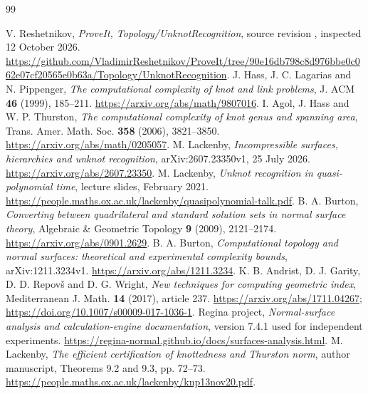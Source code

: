 \documentclass[11pt]{article}
\theoremstyle{definition}
\theoremstyle{remark}
\begin{document}
\begin{thebibliography}{99}
\raggedright
{} V. Reshetnikov, \emph{ProveIt, Topology/UnknotRecognition},
source revision , inspected
12 October 2026.
\url{https://github.com/VladimirReshetnikov/ProveIt/tree/90e16db798c8d976bbe0c062e07cf20565e0b63a/Topology/UnknotRecognition}.
 J. Hass, J. C. Lagarias and N. Pippenger,
\emph{The computational complexity of knot and link problems},
J. ACM \textbf{46} (1999), 185--211.
\url{https://arxiv.org/abs/math/9807016}.
 I. Agol, J. Hass and W. P. Thurston,
\emph{The computational complexity of knot genus and spanning area},
Trans. Amer. Math. Soc. \textbf{358} (2006), 3821--3850.
\url{https://arxiv.org/abs/math/0205057}.
 M. Lackenby,
\emph{Incompressible surfaces, hierarchies and unknot recognition},
arXiv:2607.23350v1, 25 July 2026.
\url{https://arxiv.org/abs/2607.23350}.
 M. Lackenby,
\emph{Unknot recognition in quasi-polynomial time}, lecture slides,
February 2021.
\url{https://people.maths.ox.ac.uk/lackenby/quasipolynomial-talk.pdf}.
 B. A. Burton,
\emph{Converting between quadrilateral and standard solution sets in
normal surface theory}, Algebraic \& Geometric Topology \textbf{9}
(2009), 2121--2174.
\url{https://arxiv.org/abs/0901.2629}.
 B. A. Burton,
\emph{Computational topology and normal surfaces: theoretical and
experimental complexity bounds}, arXiv:1211.3234v1.
\url{https://arxiv.org/abs/1211.3234}.
 K. B. Andrist, D. J. Garity, D. D. Repov\v{s}
and D. G. Wright, \emph{New techniques for computing geometric index},
Mediterranean J. Math. \textbf{14} (2017), article 237.
\url{https://arxiv.org/abs/1711.04267};
\url{https://doi.org/10.1007/s00009-017-1036-1}.
 Regina project, \emph{Normal-surface analysis and
calculation-engine documentation}, version 7.4.1 used for independent
experiments.
\url{https://regina-normal.github.io/docs/surfaces-analysis.html}.
 M. Lackenby,
\emph{The efficient certification of knottedness and Thurston norm},
author manuscript, Theorems 9.2 and 9.3, pp. 72--73.
\url{https://people.maths.ox.ac.uk/lackenby/knp13nov20.pdf}.
\end{thebibliography}
\end{document}
